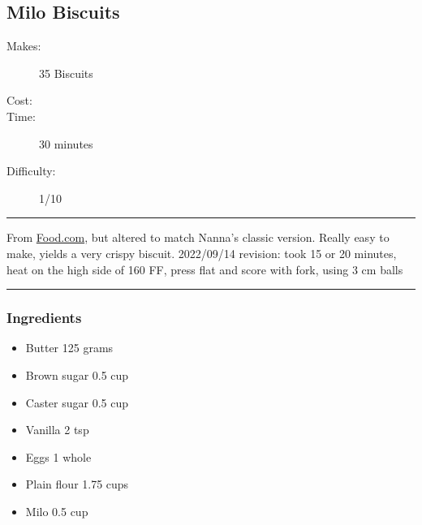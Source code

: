 \documentclass[]{article}
\begin{document}
\subsection*{\center\huge Milo Biscuits}
\begin{description}
\item[Makes:] 35 Biscuits
\item[Cost:] \textdollar
\item[Time:] 30 minutes
\item[Difficulty:] 1/10
\end{description}
\vspace{0.2cm}\hrule\vspace{0.5cm}
\begin{adjustwidth}{0.5 cm}{0.5 cm}

From \href{https://www.food.com/recipe/jessgarfields-milo-biscuits-123173}{Food.com}, but altered to match Nanna’s classic version. Really easy to make, yields a very crispy biscuit. 2022/09/14 revision: took 15 or 20 minutes, heat on the high side of 160 FF, press flat and score with fork, using 3 cm balls \hfill{}\color{black}

\end{adjustwidth}
\vspace{0.5cm}\hrule
\subsubsection*{\Large Ingredients}
\begin{multicols}{2}
\begin{itemize}
 \item Butter \hfill 125 grams
 \item Brown sugar \hfill 0.5 cup
 \item Caster sugar \hfill 0.5 cup
 \item Vanilla \hfill 2 tsp
 \item Eggs \hfill 1 whole
 \item Plain flour \hfill 1.75 cups
 \item Milo \hfill 0.5 cup
\end{itemize}
\end{multicols}
\end{document}
